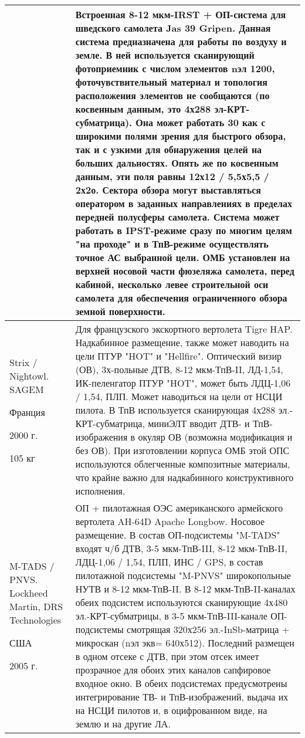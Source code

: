 \begin{landscape}
\begin{longtable}{| p{6cm} | p{18cm} |}
	& 
		Встроенная 8-12 мкм-IRST + ОП-система для шведского самолета Jas 39 Gripen. 
		Данная система предназначена для работы по воздуху и земле. В ней используется сканирующий фотоприемник с числом элементов nэл 1200, фоточувствительный материал и топология расположения элементов не сообщаются (по косвенным данным, это 4х288 эл-КРТ-субматрица). Она может работать 30 как с широкими полями зрения для быстрого обзора, так и с узкими для обнаружения целей на больших дальностях. Опять же по косвенным данным, эти поля равны 12х12 / 5,5х5,5 / 2х2о. 
		Сектора обзора могут выставляться оператором в заданных направлениях в пределах передней полусферы самолета. Система может работать в IPST-режиме сразу по многим целям "на проходе" и в ТпВ-режиме осуществлять точное АС выбранной цели. 
		ОМБ установлен на верхней носовой части фюзеляжа самолета, перед кабиной, несколько левее строительной оси самолета для обеспечения ограниченного обзора земной поверхности. 
		  
	\\ \hline
		Strix / Nightowl. SAGEM	
		
		Франция	
		
		2000 г. 	
		
		105 кг        
	&  
		Для французского экскортного вертолета Tigre HAP. Надкабинное размещение, также может наводить на цели ПТУР "HOT" и "Hellfire". 
		Оптический визир (ОВ), 3х-польные ДТВ, 8-12 мкм-ТпВ-II, ЛД-1,54, ИК-пеленгатор ПТУР "HOT", 
		может быть ЛДЦ-1,06 / 1,54, ПЛП. Может наводиться на цели от НСЦИ пилота. В ТпВ используется сканирующая 4х288 эл.-КРТ-субматрица, миниЭЛТ вводит ДТВ- и ТпВ-изображения в окуляр ОВ (возможна модификация и без ОВ). 
		При изготовлении корпуса ОМБ этой ОПС используются облегченные композитные материалы, что 
		крайне важно для надкабинного конструктивного исполнения.
		   
	\\ \hline
		M-TADS / PNVS. Lockheed Martin, DRS Technologies
		\cite[]{lockheedmartin}
		
		США	
		
		2005 г. 
		        
	& 
		ОП + пилотажная ОЭС американского армейского вертолета AH-64D Apache Longbow. Носовое размещение. 
		В состав ОП-подсистемы "M-TADS" входят ч/б ДТВ, 3-5 мкм-ТпВ-III, 8-12 мкм-ТпВ-II, ЛДЦ-1,06 / 1,54, ПЛП, ИНС / GPS, в состав пилотажной подсистемы "M-PNVS" широкопольные НУТВ и 8-12 мкм-ТпВ-II. 
		В 8-12 мкм-ТпВ-II-каналах обеих подсистем используются сканирующие 4х480 эл.-КРТ-субматрицы, 
		в 3-5 мкм-ТпВ-III-канале ОП-подсистемы смотрящая 320х256 эл.-InSb-матрица + микроскан (nэл
		экв= 640х512). Последний размещен в одном отсеке с ДТВ, при этом отсек имеет прозрачное для обоих этих каналов сапфировое входное окно. 
		В обеих подсистемах предусмотрены интегрирование ТВ- и ТпВ-изображений, выдача их на НСЦИ 
		пилотов и, в оцифрованном виде, на землю и на другие ЛА.
		    

\end{longtable}
\end{landscape}
